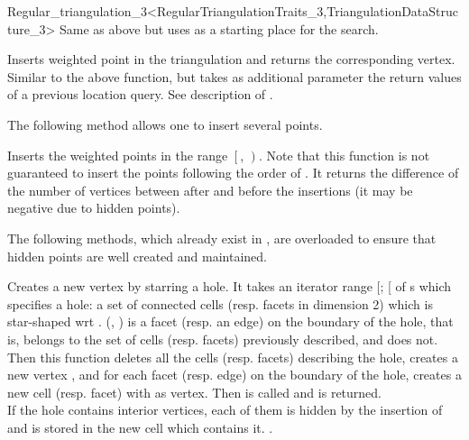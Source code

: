 \begin{ccRefClass}{Regular_triangulation_3<RegularTriangulationTraits_3,TriangulationDataStructure_3>}
{ Same as above but uses  as a starting place for the search. }

{Inserts weighted point  in the triangulation and returns the corresponding
 vertex. Similar to the above  function, but takes as additional
 parameter the return values of a previous location query.  See description of
 .}

The following method allows one to insert several points.

{Inserts the weighted points in the range $\left[\right.$,
$\left.\right)$. 
Note that this function is not guaranteed to insert the points
following the order of .
It returns the difference of the number of vertices between after and
before the insertions (it may be negative due to hidden points).
}

The following methods, which already exist in , are
overloaded to ensure that hidden points are well created and maintained.

{Creates a new vertex by starring a hole.  It takes an iterator range
[; [ of s which specifies
a hole: a set of connected cells (resp. facets in dimension 2) which is
star-shaped wrt .
(, ) is a facet (resp. an edge) on the boundary of the hole,
that is,  belongs to the set of cells (resp.  facets) previously
described, and  does not.  Then this function deletes
all the cells (resp. facets) describing the hole, creates a new vertex
, and for each facet (resp. edge) on the boundary of the hole, creates
a new cell (resp. facet) with  as vertex.  Then 
is called and  is returned.\\
If the hole contains interior vertices, each of them is hidden by the insertion
of  and is stored in the new cell which contains it.
.}


\end{ccRefClass}
